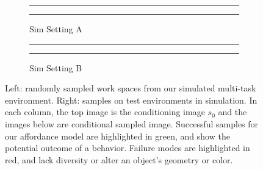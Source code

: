 \begin{figure}[t]
\begin{subfigure}[b]{0.32\textwidth}
        \hspace{0.5cm}\textcolor{green}{\rule{3cm}{2px}} \hspace{0.5cm} \textcolor{red}{\rule{1cm}{2px}}
        
        Sim Setting A
    \end{subfigure}
    \begin{subfigure}[b]{0.32\textwidth}
        \center
        
    
        \hspace{0.5cm}\textcolor{green}{\rule{3cm}{2px}} \hspace{0.5cm} \textcolor{red}{\rule{1cm}{2px}}
        
        Sim Setting B
    \end{subfigure}
    \caption{Left: randomly sampled work spaces from our simulated multi-task environment. Right: samples on test environments in simulation. In each column, the top image is the conditioning image $s_0$ and the images below are conditional sampled image. Successful samples for our affordance model are highlighted in green, and show the potential outcome of a behavior. Failure modes are highlighted in red, and lack diversity or alter an object's geometry or color.  }
    \label{fig:samples}
    \vspace{-0.5cm}
\end{figure}